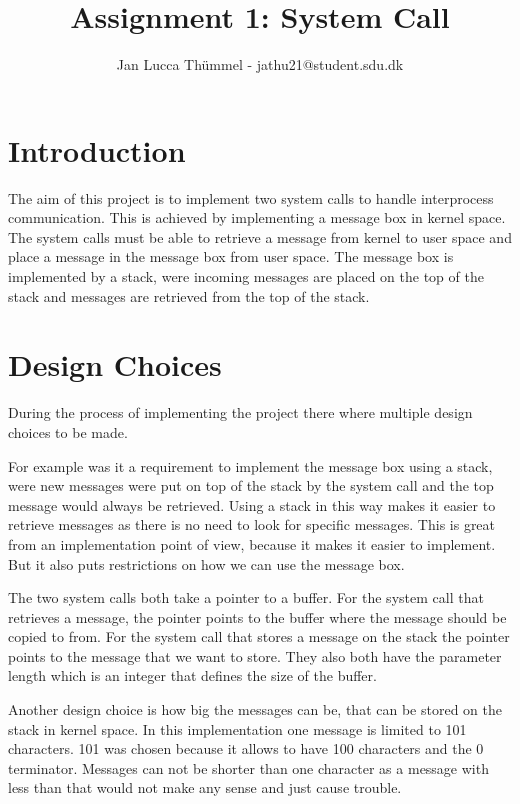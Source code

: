 \documentclass[12pt,a4paper]{report}
\author{Jan Lucca Thümmel - jathu21@student.sdu.dk}
\title{Assignment 1: System Call}
\begin{document}
\maketitle

\tableofcontents
\newpage

\section{Introduction}
The aim of this project is to implement two system calls to handle interprocess communication. This is achieved by implementing a message box in kernel space. The system calls must be able to retrieve a message from kernel to user space and place a message in the message box from user space. The message box is implemented by a stack, were incoming messages are placed on the top of the stack and messages are retrieved from the top of the stack.

\section{Design Choices}
During the process of implementing the project there where multiple design choices to be made.  

For example was it a requirement to implement the message box using a stack, were new messages were put on top of the stack by the system call and the top message would always be retrieved. Using a stack in this way makes it easier to retrieve messages as there is no need to look for specific messages. This is great from an implementation point of view, because it makes it easier to implement. But it also puts restrictions on how we can use the message box.

The two system calls both take a pointer to a buffer. For the system call that retrieves a message, the pointer points to the buffer where the message should be copied to from. For the system call that stores a message on the stack the pointer points to the message that we want to store. They also both have the parameter length which is an integer that defines the size of the buffer.

Another design choice is how big the messages can be, that can be stored on the stack in kernel space. In this implementation one message is limited to 101 characters. 101 was chosen because it allows to have 100 characters and the 0 terminator. Messages can not be shorter than one character as a message with less than that would not make any sense and just cause trouble.
\end{document}

